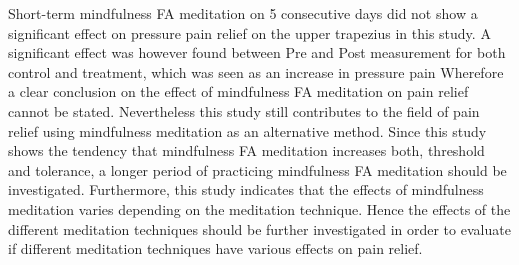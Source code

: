 Short-term mindfulness FA meditation on 5 consecutive days did not show a significant effect on pressure pain relief on the upper trapezius in this study. A significant effect was however found between Pre and Post measurement for both control and treatment, which was seen as an increase in pressure pain
Wherefore a clear conclusion on the effect of mindfulness FA meditation on pain relief cannot be stated. Nevertheless this study still contributes to the field of pain relief using mindfulness meditation as an alternative method. Since this study shows the tendency that mindfulness FA meditation increases both, threshold and tolerance, a longer period of practicing mindfulness FA meditation should be investigated. Furthermore, this study indicates that the effects of mindfulness meditation varies depending on the meditation technique. Hence the effects of the different meditation techniques should be further investigated in order to evaluate if different meditation techniques have various effects on pain relief. 